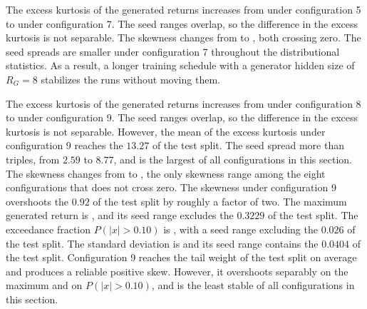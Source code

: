 The excess kurtosis of the generated returns increases from  under configuration 5 to  under configuration 7. The seed ranges overlap, so the difference in the excess kurtosis is not separable. The skewness changes from  to , both crossing zero. The seed spreads are smaller under configuration 7 throughout the distributional statistics. As a result, a longer training schedule with a generator hidden size of $R_G = 8$ stabilizes the runs without moving them.

The excess kurtosis of the generated returns increases from  under configuration 8 to  under configuration 9. The seed ranges overlap, so the difference in the excess kurtosis is not separable. However, the mean of the excess kurtosis under configuration 9 reaches the $13.27$ of the test split. The seed spread more than triples, from $2.59$ to $8.77$, and is the largest of all configurations in this section. The skewness changes from  to , the only skewness range among the eight configurations that does not cross zero. The skewness under configuration 9 overshoots the $0.92$ of the test split by roughly a factor of two. The maximum generated return is , and its seed range excludes the $0.3229$ of the test split. The exceedance fraction $P(|x| > 0.10)$ is , with a seed range excluding the $0.026$ of the test split. The standard deviation is  and its seed range contains the $0.0404$ of the test split. Configuration 9 reaches the tail weight of the test split on average and produces a reliable positive skew. However, it overshoots separably on the maximum and on $P(|x| > 0.10)$, and is the least stable of all configurations in this section.

